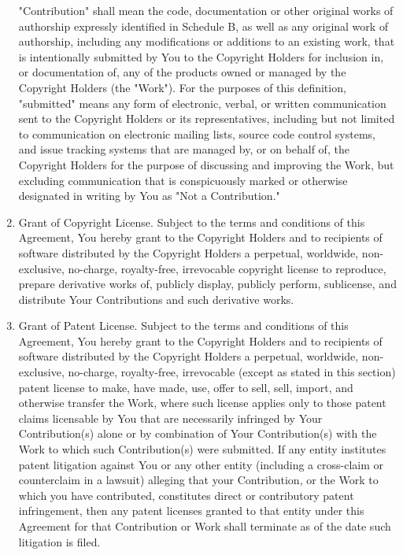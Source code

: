 \documentclass[a4paper,12pt,notitlepage]{article}
\begin{document}
\begin{Form}
\begin{enumerate}
{  "Contribution" shall mean the code, documentation or other original
  works of authorship expressly identified in Schedule B, as well as
  any original work of authorship, including
  any modifications or additions to an existing work, that is intentionally
  submitted by You to the Copyright Holders for inclusion in, or
  documentation of, any of the products owned or managed by the
  Copyright Holders (the "Work"). For the purposes of this definition,
  "submitted" means any form of electronic, verbal, or written
  communication sent to the Copyright Holders or its representatives,
  including but not limited to communication on electronic mailing
  lists, source code control systems, and issue tracking systems
  that are managed by, or on behalf of, the Copyright Holders for the
  purpose of discussing and improving the Work, but excluding
  communication that is conspicuously marked or otherwise designated
  in writing by You as "Not a Contribution."}
\item{Grant of Copyright License. Subject to the terms and conditions
  of this Agreement, You hereby grant to the Copyright Holders and to
  recipients of software distributed by the Copyright Holders a
  perpetual, worldwide, non-exclusive, no-charge, royalty-free,
  irrevocable copyright license to reproduce, prepare derivative works
  of, publicly display, publicly perform, sublicense, and distribute
  Your Contributions and such derivative works.}
\item{Grant of Patent License. Subject to the terms and conditions of
  this Agreement, You hereby grant to the Copyright Holders and to
  recipients of software distributed by the Copyright Holders
  a perpetual, worldwide, non-exclusive, no-charge, royalty-free,
  irrevocable (except as stated in this section) patent license
  to make, have made, use, offer to sell, sell, import, and otherwise
  transfer the Work, where such license applies only to those
  patent claims licensable by You that are necessarily infringed
  by Your Contribution(s) alone or by combination of Your Contribution(s)
  with the Work to which such Contribution(s) were submitted.
  If any entity institutes patent litigation against You or any
  other entity (including a cross-claim or counterclaim in a lawsuit)
  alleging that your Contribution, or the Work to which you have
  contributed, constitutes direct or contributory patent infringement,
  then any patent licenses granted to that entity under this Agreement
  for that Contribution or Work shall terminate as of the date such
  litigation is filed.}

\end{enumerate}
\end{Form}
\end{document}
